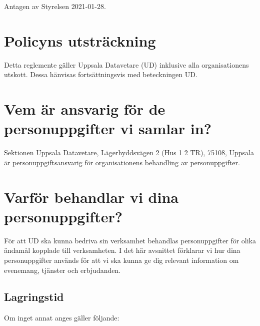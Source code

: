 \documentclass[a4paper]{article}
\title{\mnamn}
\date{}
\begin{document}
\maketitle

Antagen av Styrelsen 2021-01-28.


\tableofcontents{}

\section{Policyns utsträckning}
Detta reglemente gäller Uppsala Datavetare (UD) inklusive alla organisationens utskott. Dessa hänvisas fortsättningsvis med beteckningen UD.

\newpage
\section{Vem är ansvarig för de personuppgifter vi samlar in?}
Sektionen Uppsala Datavetare, Lägerhyddsvägen 2 (Hus 1 2 TR), 75108, Uppsala är personuppgiftsansvarig för
organisationens behandling av personuppgifter.

\section{Varför behandlar vi dina personuppgifter?}
För att UD ska kunna bedriva sin verksamhet behandlas personuppgifter för olika
ändamål kopplade till verksamheten.
I det här avsnittet förklarar vi hur dina personuppgifter används för att vi ska kunna ge
dig relevant information om evenemang, tjänster och erbjudanden.

\subsection{Lagringstid}
  Om inget annat anges gäller följande:
\end{document}
